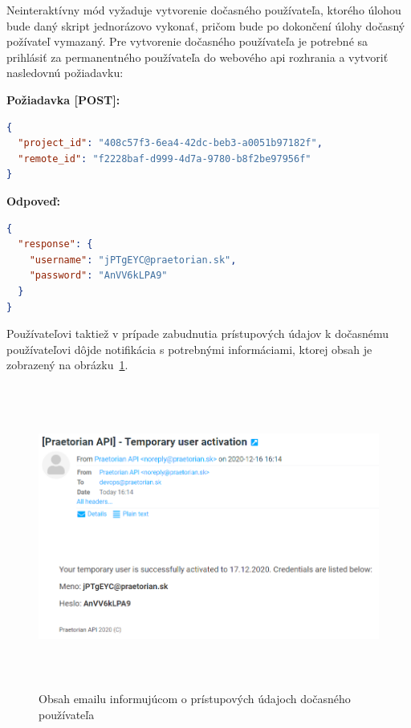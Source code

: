 Neinteraktívny mód vyžaduje vytvorenie dočasného používateľa, ktorého úlohou bude daný skript jednorázovo vykonať, pričom bude po
dokončení úlohy dočasný požívateľ vymazaný.
Pre vytvorenie dočasného používateľa je potrebné sa prihlásiť za permanentného používateľa do webového api rozhrania a
vytvoriť nasledovnú požiadavku:

\textbf{\large Požiadavka [POST]:}

\begin{lstlisting}[language=json,firstnumber=1]
{
  "project_id": "408c57f3-6ea4-42dc-beb3-a0051b97182f",
  "remote_id": "f2228baf-d999-4d7a-9780-b8f2be97956f"
}
\end{lstlisting}

\textbf{\large Odpoveď:}

\begin{lstlisting}[language=json,firstnumber=1]
{
  "response": {
    "username": "jPTgEYC@praetorian.sk",
    "password": "AnVV6kLPA9"
  }
}
\end{lstlisting}

Používateľovi taktiež v prípade zabudnutia prístupových údajov k dočasnému používateľovi dôjde notifikácia s potrebnými
informáciami, ktorej obsah je zobrazený na obrázku~\ref{fig:obr_18}.

\begin{figure}[H]
\begin{center}\includegraphics[width=\textwidth,height=10cm,keepaspectratio=true]{assets/temporary_credentials.png}\end{center}
\caption[Obsah emailu informujúcom o prístupových údajoch dočasného používateľa]{Obsah emailu informujúcom o prístupových údajoch dočasného používateľa}\label{fig:obr_18}
\end{figure}

